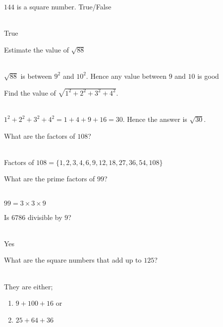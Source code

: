 \documentclass[addpoints,12pt]{exam}
\begin{document}
\begin{questions}
 \question $144$ is a square number. True/False
	\ifprintanswers
	  \begin{solution}\\
		True
	  \end{solution}
	\else
	  \makeemptybox{1.33in}
	\fi
	
 \question Estimate the value of $\sqrt{88}$
	\ifprintanswers
	  \begin{solution}\\
		$\sqrt{88}$ is between $9^2$ and $10^2$. Hence any value between $9$ and $10$ is good
	  \end{solution}
	\else
	  \makeemptybox{1.33in}
	\fi
 
 \question Find the value of $\sqrt{1^2+2^2+3^2+4^2}$.
	\ifprintanswers
	  \begin{solution}\\
		$1^2+2^2+3^2+4^2= 1+4+9+16=30$. Hence the answer is $\sqrt{30}$.
	  \end{solution}
	\else
	  \makeemptybox{1.33in}
	\fi
	
 \question What are the factors of $108$?
	\ifprintanswers
	  \begin{solution}\\
		Factors of $108=\{1, 2, 3, 4, 6, 9, 12, 18, 27, 36, 54, 108\}$ 
	  \end{solution}
	\else
	  \makeemptybox{1.33in}
	\fi
 \question What are the prime factors of $99$?
	\ifprintanswers
	  \begin{solution}\\
		$99=3\times3\times9$
	  \end{solution}
	\else
	  \makeemptybox{1.33in}
	\fi
 
 \question Is $6786$ divisible by $9$?
	\ifprintanswers
	  \begin{solution}\\
		Yes
	  \end{solution}
	\else
	  \makeemptybox{1.33in}
	\fi
 
 \question What are the square numbers that add up to $125$?
	\ifprintanswers
	  \begin{solution}\\
		They are either; 
		\begin{enumerate}
		 \item $9 + 100 + 16$ or
		 \item $25 + 64 + 36$
		\end{enumerate}
	  \end{solution}
	\else
	  \makeemptybox{1.33in}
	\fi
 

\end{questions}
\end{document}
